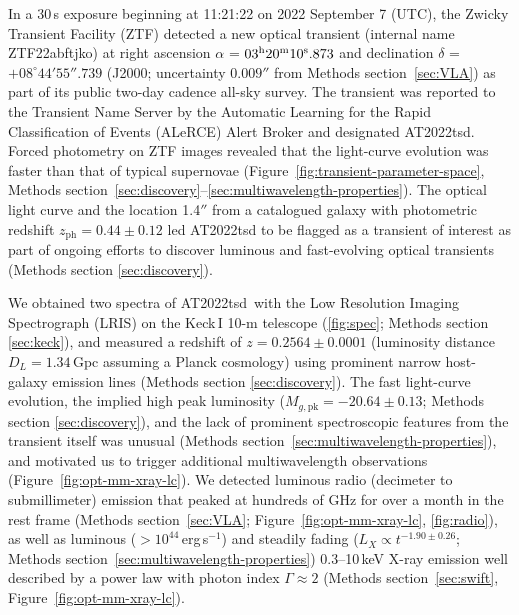 \documentclass{nature_plusfigure}
\newcommand{\at}{AT2022tsd}
\begin{document}
In a 30\,s exposure beginning at 11:21:22 on 2022 September 7 (UTC), the Zwicky Transient Facility (ZTF\cite{Graham2019,Bellm2019}) detected a new optical transient (internal name ZTF22abftjko) at right ascension $\alpha$ = $03^{\rm{h}}20^{\rm{m}}10^{\rm{s}}.873$ and declination $\delta$ = $+08^{\circ} 44' 55''.739$ 
(J2000; uncertainty $0.009''$ from Methods section~\ref{sec:VLA}) as part of its public two-day cadence all-sky survey.
The transient was reported\cite{Munoz-Arancibia2022} to the Transient Name Server by the Automatic Learning for the Rapid Classification of Events (ALeRCE) Alert Broker\cite{Forster2021} and designated AT2022tsd.
Forced photometry on ZTF images\cite{Masci2019} revealed that the light-curve evolution was faster than that of typical supernovae (Figure~\ref{fig:transient-parameter-space}, Methods section~\ref{sec:discovery}--\ref{sec:multiwavelength-properties}).
The optical light curve and the location 1.4$''$ from a catalogued\cite{Beck2021} galaxy with photometric redshift $z_\mathrm{ph}=0.44\pm0.12$ led AT2022tsd to be flagged as a transient of interest as part of ongoing efforts to discover luminous and fast-evolving optical transients (Methods section \ref{sec:discovery}).

We obtained two spectra of \at\ with the Low Resolution Imaging Spectrograph (LRIS\cite{Oke1995}) on the Keck\,I 10-m telescope (\ref{fig:spec}; Methods section \ref{sec:keck}), and measured\cite{Ho2022_Astronote_Keck} a redshift of $z=0.2564\pm0.0001$ (luminosity distance $D_L=1.34\,$Gpc assuming a Planck cosmology\cite{Planck2020}) using prominent narrow host-galaxy emission lines (Methods section \ref{sec:discovery}). 
The fast light-curve evolution, the implied high peak luminosity ($M_{g,\mathrm{pk}}=-20.64\pm0.13$; Methods section \ref{sec:discovery}), and the lack of prominent spectroscopic features from the transient itself was unusual (Methods section~\ref{sec:multiwavelength-properties}), and motivated us to trigger additional multiwavelength observations (Figure~\ref{fig:opt-mm-xray-lc}).
We detected luminous radio (decimeter\cite{Ho2022Astronote_radio} to submillimeter) emission that peaked at hundreds of GHz for over a month in the rest frame (Methods section~\ref{sec:VLA}; Figure~\ref{fig:opt-mm-xray-lc}, \ref{fig:radio}),
as well as luminous ($>10^{44}\,$erg\,s$^{-1}$) and steadily fading ($L_X\propto t^{-1.90\pm0.26}$; Methods section~\ref{sec:multiwavelength-properties}) 0.3--10\,keV X-ray emission\cite{Schulze2022Astronote_xray} well described by a power law with photon index $\Gamma\approx2$ (Methods section~\ref{sec:swift}, Figure~\ref{fig:opt-mm-xray-lc}).
\end{document}
